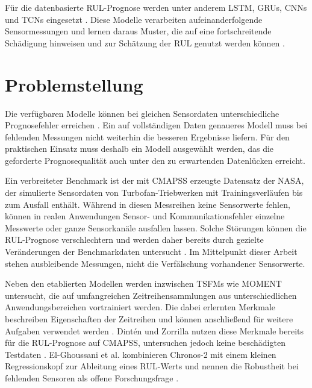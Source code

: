 Für die datenbasierte \ac{RUL}-Prognose werden unter anderem \ac{LSTM}, \acp{GRU}, \acp{CNN} und \acp{TCN} eingesetzt \parencite[15--16]{wuRemainingUsefulLife2024}. Diese Modelle verarbeiten aufeinanderfolgende Sensormessungen und lernen daraus Muster, die auf eine fortschreitende Schädigung hinweisen und zur Schätzung der \ac{RUL} genutzt werden können \parencite[3, 6]{wangRemainingUsefulLife2020}.

\section{Problemstellung}

Die verfügbaren Modelle können bei gleichen Sensordaten unterschiedliche Prognosefehler erreichen \parencite[Abschn.~5]{dintenUsingTimeSeries2025}. Ein auf vollständigen Daten genaueres Modell muss bei fehlenden Messungen nicht weiterhin die besseren Ergebnisse liefern. Für den praktischen Einsatz muss deshalb ein Modell ausgewählt werden, das die geforderte Prognosequalität auch unter den zu erwartenden Datenlücken erreicht.

Ein verbreiteter Benchmark ist der mit \ac{CMAPSS} erzeugte Datensatz der \ac{NASA}, der simulierte Sensordaten von Turbofan-Triebwerken mit Trainingsverläufen bis zum Ausfall enthält. Während in diesen Messreihen keine Sensorwerte fehlen, können in realen Anwendungen Sensor- und Kommunikationsfehler einzelne Messwerte oder ganze Sensorkanäle ausfallen lassen. Solche Störungen können die \ac{RUL}-Prognose verschlechtern und werden daher bereits durch gezielte Veränderungen der Benchmarkdaten untersucht \parencite[7--10]{tangDeepLearningFramework2026}. Im Mittelpunkt dieser Arbeit stehen ausbleibende Messungen, nicht die Verfälschung vorhandener Sensorwerte.

Neben den etablierten Modellen werden inzwischen \acp{TSFM} wie MOMENT untersucht, die auf umfangreichen Zeitreihensammlungen aus unterschiedlichen Anwendungsbereichen vortrainiert werden. Die dabei erlernten Merkmale beschreiben Eigenschaften der Zeitreihen und können anschließend für weitere Aufgaben verwendet werden \parencite[1--4]{goswamiMOMENTFamilyOpen2024}. Dintén und Zorrilla nutzen diese Merkmale bereits für die \ac{RUL}-Prognose auf \ac{CMAPSS}, untersuchen jedoch keine beschädigten Testdaten \parencite[246, 252--255]{dintenUsingTimeSeries2025}. El-Ghoussani et al. kombinieren Chronos-2 mit einem kleinen Regressionskopf zur Ableitung eines \ac{RUL}-Werts und nennen die Robustheit bei fehlenden Sensoren als offene Forschungsfrage \parencite[2--4]{el-ghoussaniTimeSeriesFoundationModel2026}.

